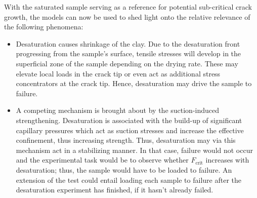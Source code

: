 With the saturated sample serving as a reference for potential sub-critical crack growth, the models can now be used to shed light onto the relative relevance of the following phenomena:
\begin{itemize}
	\item Desaturation causes shrinkage of the clay. Due to the desaturation front progressing from the sample's surface, tensile stresses will develop in the superficial zone of the sample depending on the drying rate. These may elevate local loads in the crack tip or even act as additional stress concentrators at the crack tip. Hence, desaturation may drive the sample to failure.
	\item A competing mechanism is brought about by the suction-induced strengthening. Desaturation is associated with the build-up of significant capillary pressures which act as suction stresses and increase the effective confinement, thus increasing strength. Thus, desaturation may via this mechanism act in a stabilizing manner. In that case, failure would not occur and the experimental task would be to observe whether $F_\text{crit}$ increases with desaturation; thus, the sample would have to be loaded to failure. An extension of the test could entail loading each sample to failure after the desaturation experiment has finished, if it hasn't already failed.
\end{itemize}
